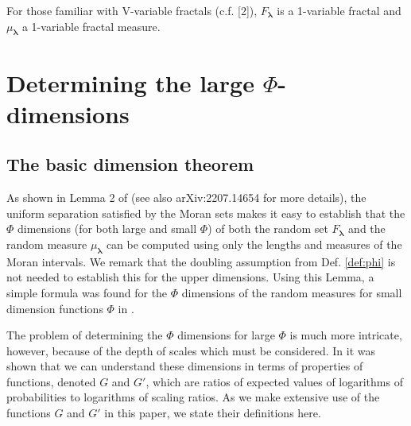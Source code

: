 \documentclass{amsart}
\theoremstyle{plain}
\numberwithin{equation}{section}
\newcommand{\blambda}{{\boldsymbol{\lambda}}}
\begin{document}
For those familiar with V-variable fractals (c.f. [2]), $F_\blambda $ is a 1-variable fractal and $\mu_\blambda$ a 1-variable fractal measure.

\section{Determining the large $\Phi$-dimensions}
\label{sec:G_functions}

\subsection{The basic dimension theorem}

As shown in Lemma 2 of \cite{HM2} (see also arXiv:2207.14654 for more details), the uniform separation satisfied by the Moran sets makes it easy to establish that the $\Phi$ dimensions 
(for both large and small $\Phi$) of both the random set $F_\blambda$ and the random measure $\mu_\blambda$ can be computed
using only the lengths and measures of the Moran intervals.  
We remark that the doubling assumption from Def. \ref{def:phi} is not needed to establish this for the upper dimensions. 
Using this Lemma, a simple formula was found for the $\Phi$ dimensions of the random measures for small dimension functions $\Phi$ in \cite[Theorem 21]{HM2}.

The problem of determining the $\Phi$ dimensions for large $\Phi$ is much more intricate, however, because of the depth of scales which must be considered. 
In \cite{HM2} it was shown that we can understand these dimensions in terms of properties of functions, denoted $G$ and $G'$, which are
ratios of expected values of logarithms of probabilities to logarithms of scaling ratios. 
As we make extensive use of the functions $G$ and $G'$ in this paper, we state their definitions here.
\end{document}
